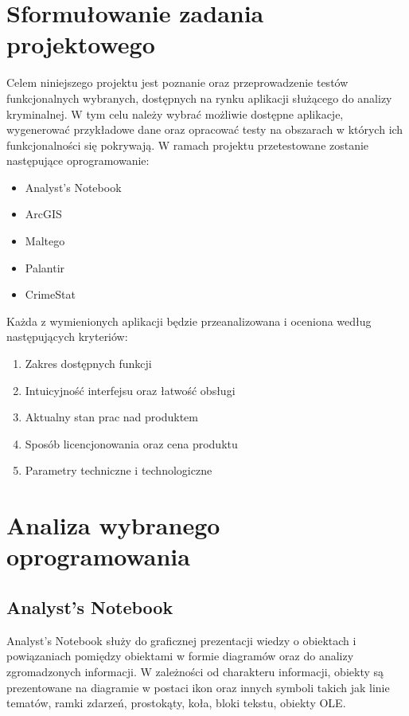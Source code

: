 \documentclass[11pt,a4paper]{article}
\begin{document}


\tableofcontents
\newpage

\section{Sformułowanie zadania projektowego}

Celem niniejszego projektu jest poznanie oraz przeprowadzenie testów funkcjonalnych wybranych, dostępnych na rynku  aplikacji służącego do analizy kryminalnej. W tym celu należy wybrać możliwie dostępne aplikacje, wygenerować przykładowe dane oraz opracować testy na obszarach w których ich funkcjonalności się pokrywają. W ramach projektu przetestowane zostanie następujące oprogramowanie:


\begin{itemize}
	\item Analyst’s Notebook
	\item ArcGIS
	\item Maltego
	\item Palantir
	\item CrimeStat
\end{itemize}
Każda z wymienionych aplikacji będzie przeanalizowana i oceniona według następujących kryteriów:
\begin{enumerate}
	\item Zakres dostępnych funkcji
	\item Intuicyjność interfejsu oraz łatwość obsługi
	\item Aktualny stan prac nad produktem
	\item Sposób licencjonowania oraz cena produktu
	\item Parametry techniczne i technologiczne
\end{enumerate}

\section{Analiza wybranego oprogramowania} 

\subsection{Analyst's Notebook}

Analyst’s Notebook służy do graficznej prezentacji wiedzy o obiektach i powiązaniach pomiędzy obiektami w formie diagramów oraz do analizy zgromadzonych informacji. W zależności od charakteru informacji, obiekty są prezentowane na diagramie w postaci ikon oraz innych symboli takich jak linie tematów, ramki zdarzeń, prostokąty, koła, bloki tekstu, obiekty OLE.
\end{document}
